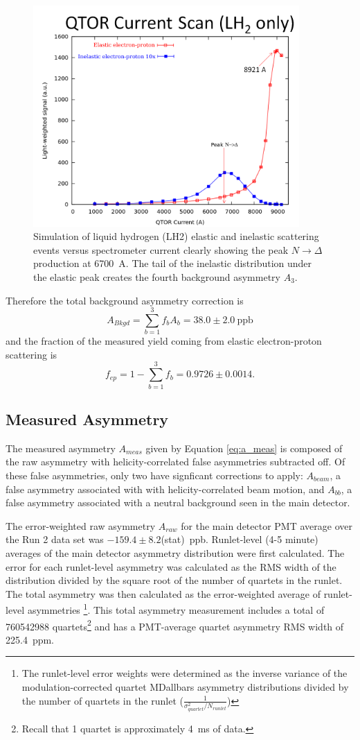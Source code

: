 \begin{figure}[ht]
\begin{center}
\includegraphics[width=4in]{./Pictures/qtor_current_scan.png}
\caption{\label{fig:sim_current_scan}Simulation of liquid hydrogen (LH2) elastic and inelastic scattering events versus \qtor spectrometer current clearly showing the peak $N\rightarrow\Delta$ production at 6700~A. The tail of the inelastic distribution under the elastic peak creates the fourth background asymmetry $A_3$.}
\end{center}
\end{figure}
Therefore the total background asymmetry correction is 
\[
A_{Bkgd}=\sum_{b=1}^3f_bA_b=38.0\pm2.0~\text{ppb}
\] 
and the fraction of the measured yield coming from elastic electron-proton scattering is 
\[
f_{ep}=1-\sum_{b=1}^3f_b=0.9726\pm 0.0014.
\]
\subsection{Measured Asymmetry}
The measured asymmetry $A_{meas}$ given by Equation \ref{eq:a_meas} is composed of the raw asymmetry with helicity-correlated false asymmetries subtracted off. Of these false asymmetries, only two have signficant corrections to apply:  $A_{beam}$, a false asymmetry associated with with helicity-correlated beam motion, and $A_{bb}$, a false asymmetry associated with a neutral background seen in the main detector.

The error-weighted raw asymmetry $A_{raw}$ for the main detector PMT average over the Run 2 data set was $-159.4\pm 8.2$(stat)~ppb. Runlet-level (4-5 minute) averages of the main detector asymmetry distribution were first calculated. The error for each runlet-level asymmetry was calculated as the RMS width of the distribution divided by the square root of the number of quartets in the runlet. The total asymmetry was then calculated as the error-weighted average of runlet-level asymmetries \footnote{The runlet-level error weights were determined as the inverse variance of the modulation-corrected quartet MDallbars asymmetry distributions divided by the number of quartets in the runlet ($\frac{1}{\sigma^2_{quartet}/N_{runlet}}$)}. This total asymmetry measurement includes a total of 760542988 quartets\footnote{Recall that 1 quartet is approximately 4~ms of data.} and has a PMT-average quartet asymmetry RMS width of 225.4~ppm.  

